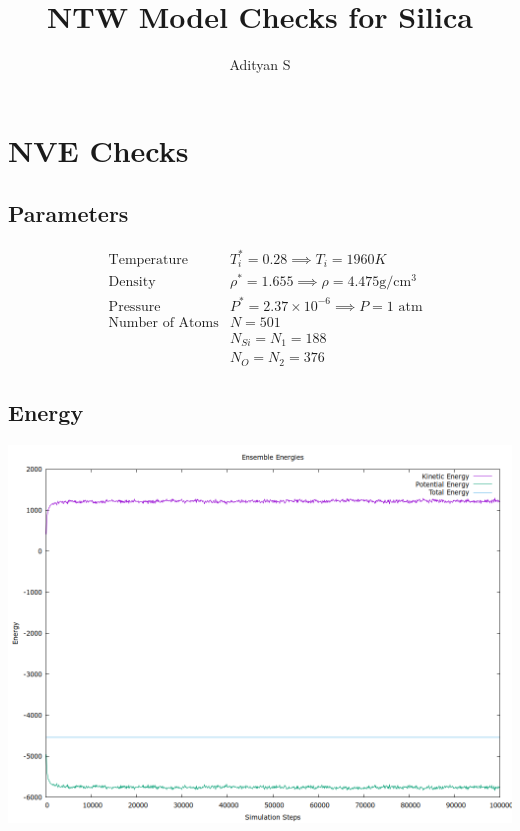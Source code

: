 \documentclass[a4paper,11pt,twoside]{article}
\author{Adityan S}
\date{}
\title{NTW Model Checks for Silica}
\begin{document}
\maketitle
\tableofcontents

\section{NVE Checks}
\label{sec:org73b2f4f}
\subsection{Parameters}
\label{sec:org5bbc8c0}
\begin{align*}
      & \mathrm{Temperature} & T^*_{i} = 0.28  \implies T_i = 1960K  \\
      & \mathrm{Density} & \rho^* = 1.655 \implies \rho = 4.475\mathrm{ g/cm^{3}} \\
      & \mathrm{Pressure} & P^* = 2.37 \times 10^{-6} \implies P = 1 \mathrm{\text{ atm}} \\
      & \mathrm{\text{Number of Atoms}} & N = 501 \\
      & & N_{Si} = N_1 = 188 \\
      & & N_{O }= N_2 = 376
\end{align*}
\subsection{Energy}
\label{sec:orgbc66be2}
\begin{center}
\includegraphics[width=.9\linewidth]{../../runs/nve_lammps_pair_style/plots/energy.png}
\end{center}
\end{document}
